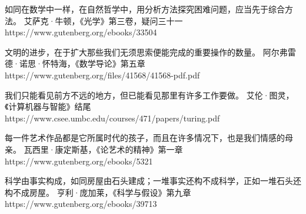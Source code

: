 %
  {如同在数学中一样，在自然哲学中，用分析方法探究困难问题，应当先于综合方法。}%
  {艾萨克·牛顿，《光学》第三卷，疑问三十一}%
  {https://www.gutenberg.org/ebooks/33504}

%
  {文明的进步，在于扩大那些我们无须思索便能完成的重要操作的数量。}%
  {阿尔弗雷德·诺思·怀特海，《数学导论》第五章}%
  {https://www.gutenberg.org/files/41568/41568-pdf.pdf}

%
  {我们只能看见前方不远的地方，但已能看见那里有许多工作要做。}%
  {艾伦·图灵，《计算机器与智能》结尾}%
  {https://www.csee.umbc.edu/courses/471/papers/turing.pdf}

%
  {每一件艺术作品都是它所属时代的孩子，而且在许多情况下，也是我们情感的母亲。}%
  {瓦西里·康定斯基，《论艺术的精神》第一章}%
  {https://www.gutenberg.org/ebooks/5321}

%
  {科学由事实构成，如同房屋由石头建成；一堆事实还构不成科学，正如一堆石头还构不成房屋。}%
  {亨利·庞加莱，《科学与假设》第九章}%
  {https://www.gutenberg.org/ebooks/39713}

